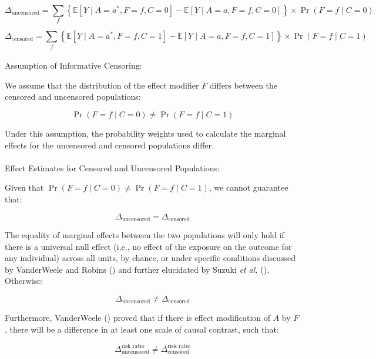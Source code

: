 \documentclass[
  single column]{article}
\makeatletter
\let\oldparagraph\paragraph
\renewcommand{\paragraph}{
    \@ifstar
      \xxxParagraphStar
      \xxxParagraphNoStar
  }
\newcommand{\xxxParagraphStar}[1]{\oldparagraph*{#1}\mbox{}}
\newcommand{\xxxParagraphNoStar}[1]{\oldparagraph{#1}\mbox{}}
\makeatother
\begin{document}
\[ \Delta_{\text{uncensored}} = \sum_{f} \left\{\mathbb{E}[Y \mid A=a^*, F=f, C=0] - \mathbb{E}[Y \mid A=a, F=f, C=0]\right\} \times \Pr(F=f \mid C=0) \]

\[ 
\Delta_{\text{censored}} = \sum_{f} \left\{\mathbb{E}[Y \mid A=a^*, F=f, C=1] - \mathbb{E}[Y \mid A=a, F=f, C=1]\right\} \times \Pr(F=f \mid C=1) 
\]

\paragraph{Assumption of Informative
Censoring:}\label{assumption-of-informative-censoring}

We assume that the distribution of the effect modifier \(F\) differs
between the censored and uncensored populations:

\[ \Pr(F=f \mid C=0) \neq \Pr(F=f \mid C=1) \]

Under this assumption, the probability weights used to calculate the
marginal effects for the uncensored and censored populations differ.

\paragraph{Effect Estimates for Censored and Uncensored
Populations:}\label{effect-estimates-for-censored-and-uncensored-populations}

Given that \(\Pr(F=f \mid C=0) \neq \Pr(F=f \mid C=1)\), we cannot
guarantee that:

\[ 
\Delta_{\text{uncensored}} = \Delta_{\text{censored}} 
\]

The equality of marginal effects between the two populations will only
hold if there is a universal null effect (i.e., no effect of the
exposure on the outcome for any individual) across all units, by chance,
or under specific conditions discussed by VanderWeele and Robins
() and further elucidated by Suzuki
\emph{et al.} ().
Otherwise:

\[ \Delta_{\text{uncensored}} \ne \Delta_{\text{censored}} \]

Furthermore, VanderWeele () proved
that if there is effect modification of \(A\) by \(F\), there will be a
difference in at least one scale of causal contrast, such that:

\[ \Delta^{\text{risk ratio}}_{\text{uncensored}} \ne \Delta^{\text{risk ratio}}_{\text{censored}} \]
\end{document}
